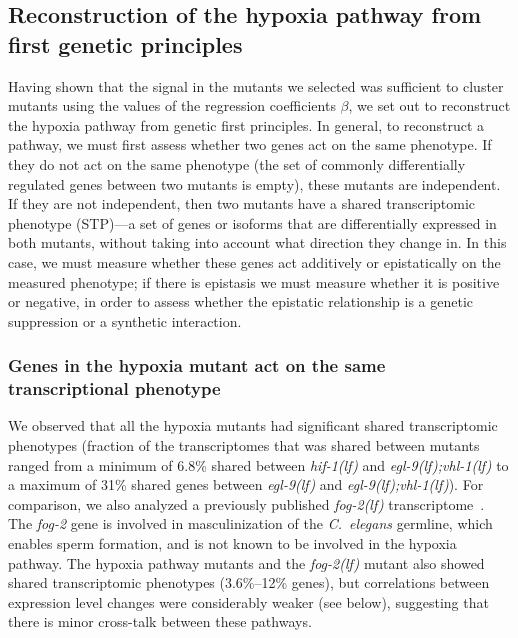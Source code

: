 \documentclass[10pt, onecolumn]{article}
\newcommand{\cel}{\emph{C.~elegans}}
\newcommand{\gene}[1]{\emph{#1}}
\newcommand{\fog}{\emph{\mbox{fog-2(lf)}}}
\newcommand{\egl}{\emph{\mbox{egl-9}(lf)}}
\newcommand{\eglvhl}{\emph{\mbox{egl-9(lf);vhl-1(lf)}}}
\newcommand{\hif}{\emph{\mbox{hif-1(lf)}}}
\begin{document}
\subsection*{Reconstruction of the hypoxia pathway from first genetic principles}
\label{sec:reconstruct}
Having shown that the signal in the mutants we selected was sufficient to
cluster mutants using the values of the regression coefficients $\beta$, we set
out to reconstruct the hypoxia pathway from genetic first principles. In general,
to reconstruct a pathway, we must first assess whether two genes act on the same
phenotype. If they do not act on the same phenotype (the set of commonly differentially
regulated genes between two mutants is empty), these mutants are independent.
If they are not independent, then two mutants have a shared transcriptomic
phenotype (STP)---a set of genes or isoforms that are differentially expressed in
both mutants, without taking into account what direction they change in. In this
case, we must measure whether these genes act additively or epistatically on the
measured phenotype; if there is epistasis we must measure whether it is
positive or negative, in order to assess whether the epistatic relationship is a
genetic suppression or a synthetic interaction.

\subsubsection*{Genes in the hypoxia mutant act on the same transcriptional phenotype}
\label{sec:phenotypes}
We observed that all the hypoxia mutants had significant shared transcriptomic
phenotypes (fraction of the transcriptomes that was shared between mutants
ranged from a minimum of 6.8\% shared between \hif{} and \eglvhl{} to a maximum
of 31\% shared genes between \egl{} and \eglvhl{}). For comparison, we also
analyzed a previously published \fog{} transcriptome~\cite{Angeles-Albores2016a}.
The \gene{fog-2} gene is involved in masculinization of the \cel{} germline,
which enables sperm formation, and is not known to be involved in the hypoxia
pathway. The hypoxia pathway mutants and the \fog{} mutant also showed shared
transcriptomic phenotypes (3.6\%--12\% genes), but correlations between
expression level changes were considerably weaker (see below), suggesting that
there is minor cross-talk between these pathways.
\end{document}
